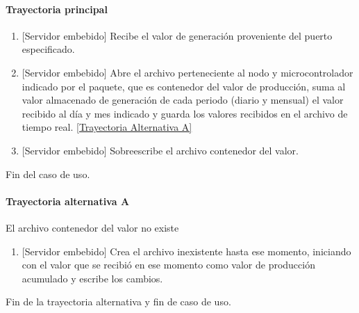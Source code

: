 \paragraph{Trayectoria principal}
\label{SUB-M-CU1.3:TP}
	\begin{enumerate}
		\item {[Servidor embebido]} Recibe el valor de generación proveniente del puerto especificado.
		
		\item {[Servidor embebido]} Abre el archivo perteneciente al nodo y microcontrolador indicado por el paquete, que es contenedor del valor de producción, suma al valor almacenado de generación de cada periodo (diario y mensual) el valor recibido al día y mes indicado y guarda los valores recibidos en el archivo de tiempo real.
		\hyperref[SUB-M-CU1.4:TA]{[Trayectoria Alternativa A]}
		
		\item {[Servidor embebido]}  Sobreescribe el archivo contenedor del valor.
	
	\end{enumerate}
	Fin del caso de uso.

\paragraph{Trayectoria alternativa A} \label{SUB-M-CU1.3:TA}
	El archivo contenedor del valor no existe
	\begin{enumerate}[label=A\arabic*.]
		\item {[Servidor embebido]} Crea el archivo inexistente hasta ese momento, iniciando con el valor que se recibió en ese momento como valor de producción acumulado y escribe los cambios.
	\end{enumerate}
	Fin de la trayectoria alternativa y fin de caso de uso.
